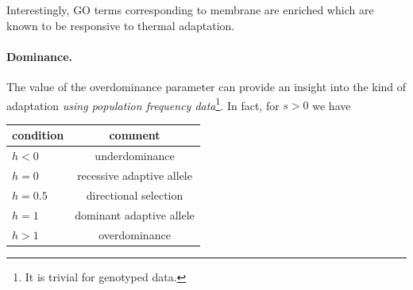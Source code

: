 \documentclass[11pt]{article}
\begin{document}
Interestingly, GO terms corresponding to membrane are enriched which are known 
to be responsive to thermal adaptation\cite{hazel1995thermal}.

\paragraph{Dominance.}
The value of the overdominance parameter can provide an insight into the kind 
of adaptation \emph{using population frequency data}\footnote{It is trivial for 
genotyped data.}. In fact, for $s>0$ we have~\cite{gillespie2010population}  
\begin{center}
	\begin{tabular}{l|c}
		condition & comment\\
		\hline
		$h<0$ &  underdominance\\
		$h=0$ & recessive adaptive allele\\
		$h=0.5$ & directional selection\\
		$h=1$&	dominant adaptive allele	\\
		$h>1$ &overdominance
	\end{tabular}
\end{center}





%
\newpage
\end{document}
